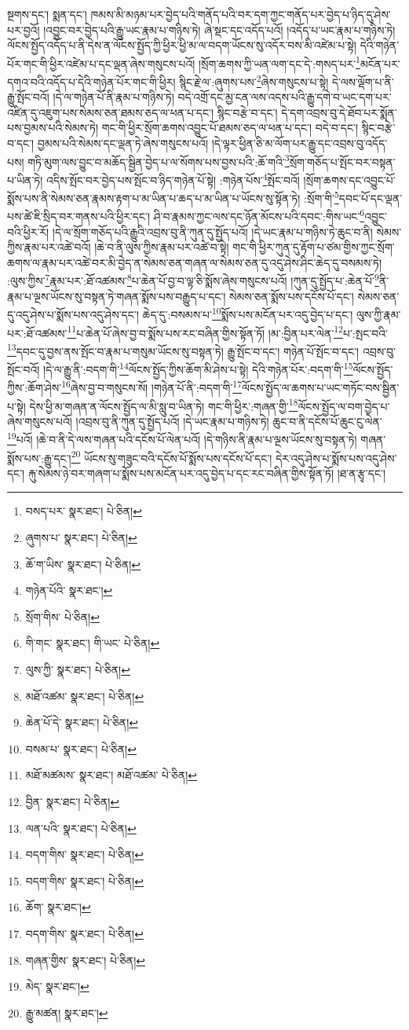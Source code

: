སྔགས་དང་། སྨན་དང་། ཁམས་མི་མཉམ་པར་བྱེད་པའི་གནོད་པའི་བར་དག་ཀྱང་གནོད་པར་བྱེད་པ་ཉིད་དུ་ཤེས་པར་བྱའོ། །འབྱུང་བར་བྱེད་པའི་རྒྱུ་ཡང་རྣམ་པ་གཉིས་ཏེ། ཞེ་སྡང་དང་འདོད་པའོ། །འདོད་པ་ཡང་རྣམ་པ་གཉིས་ཏེ། ལོངས་སྤྱོད་འདོད་པ་ནི་དེས་ན་ལོངས་སྤྱོད་ཀྱི་ཕྱིར་ཕྱི་མ་ལ་བདག་ཡོངས་སུ་འདོར་བས་མི་འཛེམ་པ་སྟེ། དེའི་གཉེན་པོར་གང་གི་ཕྱིར་འཛེམ་པ་དང་ལྡན་ཞེས་གསུངས་པའོ། །སྲོག་ཆགས་ཀྱི་ཡན་ལག་དང་དེ་:གསད་པར་\footnote{བསད་པར་  སྣར་ཐང་།  པེ་ཅིན། }མངོན་པར་དགའ་བའི་འདོད་པ་དེའི་གཉེན་པོར་གང་གི་ཕྱིར། སྙིང་རྗེ་ལ་:ཞུགས་པས་\footnote{ཞུགས་པ་  སྣར་ཐང་།  པེ་ཅིན། }ཞེས་གསུངས་པ་སྟེ། དེ་ལས་ལྡོག་པ་ནི་རྒྱུ་སྤོང་བའོ། །དེ་ལ་གཉེན་པོ་ནི་རྣམ་པ་གཉིས་ཏེ། བདེ་འགྲོ་དང་མྱ་ངན་ལས་འདས་པའི་རྒྱུ་དགེ་བ་ཡང་དག་པར་འཛིན་དུ་འཇུག་པས་སེམས་ཅན་ཐམས་ཅད་ལ་ཕན་པ་དང་། སྙིང་བརྩེ་བ་དང་། དེ་དག་འབྲས་བུ་དེ་ཐོབ་པར་སྨོན་པས་བྱམས་པའི་སེམས་ཏེ། གང་གི་ཕྱིར་སྲོག་ཆགས་འབྱུང་པོ་ཐམས་ཅད་ལ་ཕན་པ་དང་། བདེ་བ་དང་། སྙིང་བརྩེ་བ་དང་། བྱམས་པའི་སེམས་དང་ལྡན་ཏེ་ཞེས་གསུངས་པའོ། །དེ་ལྟར་ཕྱིན་ཅི་མ་ལོག་པར་རྒྱུ་དང་འབྲས་བུ་འདོད་པས། གཏི་མུག་ལས་བྱུང་བ་མཆོད་སྦྱིན་བྱེད་པ་ལ་སོགས་པས་བྱས་པའི་:ཆོ་གའི་\footnote{ཆོ་ག་ཡིས་  སྣར་ཐང་།  པེ་ཅིན། }སྲོག་གཅོད་པ་སྤོང་བར་བསྟན་པ་ཡིན་ཏེ། འདིས་སྤོང་བར་བྱེད་པས་སྤོང་བ་ཉིད་གཉེན་པོ་སྟེ། :གཉེན་པོས་\footnote{གཉེན་པོའི་  སྣར་ཐང་། }སྤོང་བའོ། །སྲོག་ཆགས་དང་འབྱུང་པོ་སྨོས་པས་ནི་སེམས་ཅན་རྣམས་རྟག་པ་མ་ཡིན་པ་ཆད་པ་མ་ཡིན་པ་ཡོངས་སུ་སྟོན་ཏེ། :སྲོག་གི་\footnote{སྲོག་གིས་  པེ་ཅིན། }དབང་པོ་དང་ལྡན་པས་ཚེ་ཇི་སྲིད་བར་གནས་པའི་ཕྱིར་དང་། ཤི་བ་རྣམས་ཀྱང་ལས་དང་ཉོན་མོངས་པའི་དབང་:གིས་ཡང་\footnote{གི་གང་  སྣར་ཐང་། གི་ཡང་  པེ་ཅིན། }འབྱུང་བའི་ཕྱིར་རོ། །དེ་ལ་སྲོག་གཅོད་པའི་རྒྱུའི་འབྲས་བུ་ནི་ཀུན་དུ་སྤྱོད་པའོ། །དེ་ཡང་རྣམ་པ་གཉིས་ཏེ་ཆུང་བ་ནི། སེམས་ཀྱིས་རྣམ་པར་འཚེ་བའོ། །ཆེ་བ་ནི་ལུས་ཀྱིས་རྣམ་པར་འཚེ་བ་སྟེ། གང་གི་ཕྱིར་ཀུན་དུ་རྟོག་པ་ཙམ་གྱིས་ཀྱང་སྲོག་ཆགས་ལ་རྣམ་པར་འཚེ་བར་མི་བྱེད་ན་སེམས་ཅན་གཞན་ལ་སེམས་ཅན་དུ་འདུ་ཤེས་ཤིང་ཆེད་དུ་བསམས་ཏེ། :ལུས་ཀྱིས་\footnote{ལུས་ཀྱི་  སྣར་ཐང་།  པེ་ཅིན། }རྣམ་པར་:ཐོ་འཚམས་\footnote{མཐོ་འཚམ་  སྣར་ཐང་།  པེ་ཅིན། }པ་ཆེན་པོ་བྱ་བ་ལྟ་ཅི་སྨོས་ཞེས་གསུངས་པའོ། །ཀུན་དུ་སྤྱོད་པ་:ཆེན་པོ་\footnote{ཆེན་པོ་དེ་  སྣར་ཐང་།  པེ་ཅིན། }ནི་རྣམ་པ་ལྔས་ཡོངས་སུ་བསྟན་ཏེ་གཞན་སྨོས་པས་བརྒྱུད་པ་དང་། སེམས་ཅན་སྨོས་པས་དངོས་པོ་དང་། སེམས་ཅན་དུ་འདུ་ཤེས་པ་སྨོས་པས་འདུ་ཤེས་དང་། ཆེད་དུ་:བསམས་པ་\footnote{བསམ་པ་  སྣར་ཐང་།  པེ་ཅིན། }སྨོས་པས་མངོན་པར་འདུ་བྱེད་པ་དང་། ལུས་ཀྱི་རྣམ་པར་:ཐོ་འཚམས་\footnote{མཐོ་མཚམས་  སྣར་ཐང་། མཐོ་འཚམ་  པེ་ཅིན། }པ་ཆེན་པོ་ཞེས་བྱ་བ་སྨོས་པས་རང་བཞིན་གྱིས་སྟོན་ཏོ། །མ་:བྱིན་པར་ལེན་\footnote{བྱིན་  སྣར་ཐང་།  པེ་ཅིན། }པ་:སྤང་བའི་\footnote{ལན་པའི་  སྣར་ཐང་།  པེ་ཅིན། }དབང་དུ་བྱས་ནས་སྤོང་བ་རྣམ་པ་གསུམ་ཡོངས་སུ་བསྟན་ཏེ། རྒྱུ་སྤོང་བ་དང་། གཉེན་པོ་སྤོང་བ་དང་། འབྲས་བུ་སྤོང་བའོ། །དེ་ལ་རྒྱུ་ནི་:བདག་གི་\footnote{བདག་གིས་  སྣར་ཐང་།  པེ་ཅིན། }ལོངས་སྤྱོད་ཀྱིས་ཆོག་མི་ཤེས་པ་སྟེ། དེའི་གཉེན་པོར་:བདག་གི་\footnote{བདག་གིས་  སྣར་ཐང་།  པེ་ཅིན། }ལོངས་སྤྱོད་ཀྱིས་:ཆོག་ཤེས་\footnote{ཆོག་  སྣར་ཐང་། }ཞེས་བྱ་བ་གསུངས་སོ། །གཉེན་པོ་ནི་:བདག་གི་\footnote{བདག་གིས་  སྣར་ཐང་།  པེ་ཅིན། }ལོངས་སྤྱོད་ལ་ཆགས་པ་ཡང་གཏོང་བས་སྦྱིན་པ་སྟེ། དེས་ཕྱི་མ་གཞན་ན་ལོངས་སྤྱོད་ལ་མི་སླུ་བ་ཡིན་ཏེ། གང་གི་ཕྱིར་:གཞན་གྱི་\footnote{གཞན་གྱིས་  སྣར་ཐང་།  པེ་ཅིན། }ལོངས་སྤྱོད་ལ་བག་བྱེད་པ་ཞེས་གསུངས་པའོ། །འབྲས་བུ་ནི་ཀུན་དུ་སྤྱོད་པའོ། །དེ་ཡང་རྣམ་པ་གཉིས་ཏེ། ཆུང་བ་ནི་དངོས་པོ་ཆུང་ངུ་ལེན་\footnote{མེད་  སྣར་ཐང་། }པའོ། །ཆེ་བ་ནི་དེ་ལས་གཞན་པའི་དངོས་པོ་ལེན་པའོ། །དེ་གཉིས་ནི་རྣམ་པ་ལྔས་ཡོངས་སུ་བསྟན་ཏེ། གཞན་སྨོས་པས་:རྒྱུ་དང་།\footnote{རྒྱུ་མཚན།  སྣར་ཐང་། } ཡོངས་སུ་གཟུང་བའི་དངོས་པོ་སྨོས་པས་དངོས་པོ་དང་། དེར་འདུ་ཤེས་པ་སྨོས་པས་འདུ་ཤེས་དང་། རྐུ་སེམས་ཉེ་བར་གཞག་པ་སྨོས་པས་མངོན་པར་འདུ་བྱེད་པ་དང་རང་བཞིན་གྱིས་སྟོན་ཏོ། །ཐ་ན་རྩྭ་དང་། 